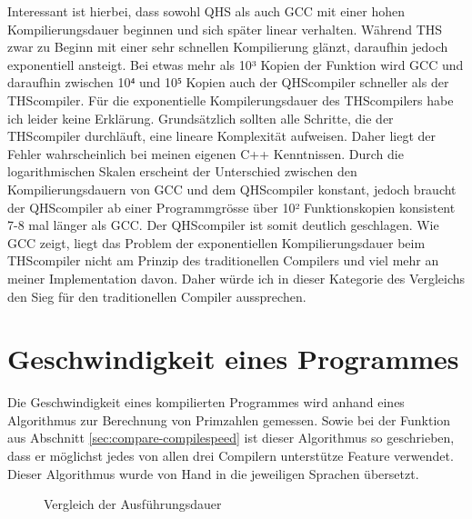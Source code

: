 Interessant ist hierbei, dass sowohl QHS als auch GCC mit einer hohen Kompilierungsdauer beginnen und sich später linear verhalten. Während THS zwar zu Beginn mit einer sehr schnellen Kompilierung glänzt,
daraufhin jedoch exponentiell ansteigt. Bei etwas mehr als 10³ Kopien der Funktion wird GCC und daraufhin zwischen 10⁴ und 10⁵ Kopien auch der QHScompiler schneller als der THScompiler. Für die exponentielle Kompilerungsdauer
des THScompilers habe ich leider keine Erklärung. Grundsätzlich sollten alle Schritte, die der THScompiler durchläuft, eine lineare Komplexität aufweisen. Daher liegt der Fehler wahrscheinlich bei meinen eigenen C++ Kenntnissen.
Durch die logarithmischen Skalen erscheint der Unterschied zwischen den Kompilierungsdauern von GCC und dem QHScompiler konstant, jedoch braucht der QHScompiler ab einer Programmgrösse über 10² Funktionskopien konsistent 7-8 mal
länger als GCC. 
Der QHScompiler ist somit deutlich geschlagen. Wie GCC zeigt, liegt das Problem der exponentiellen Kompilierungsdauer beim THScompiler nicht am Prinzip des traditionellen Compilers und viel mehr an meiner Implementation davon.
Daher würde ich in dieser Kategorie des Vergleichs den Sieg für den traditionellen Compiler aussprechen.


\section{Geschwindigkeit eines Programmes}
Die Geschwindigkeit eines kompilierten Programmes wird anhand eines Algorithmus zur Berechnung von Primzahlen gemessen. Sowie bei der Funktion aus Abschnitt \ref{sec:compare-compilespeed} ist dieser Algorithmus so geschrieben,
dass er möglichst jedes von allen drei Compilern unterstütze Feature verwendet. Dieser Algorithmus wurde von Hand in die jeweiligen Sprachen übersetzt.

\begin{figure}[h!]
\centering
\label{fig:executespeed}
\caption{Vergleich der Ausführungsdauer}
\end{figure}

